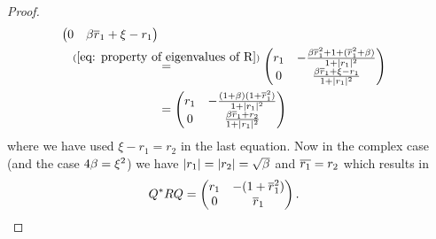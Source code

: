 \begin{proof}
\begin{align*}
\begin{pmatrix}
			0 &  \momCoeff\conjugate{r}_1 + \xi - r_1
		\end{pmatrix}\\
		&\lxeq{(\ref{eq: property of eigenvalues of R})}\begin{pmatrix}
			r_1
			& -\frac{\momCoeff \conjugate{r}_1^2 + 1+ (\conjugate{r}_1^2 + \momCoeff)}{1+|r_1|^2} \\
			0 &  \frac{\momCoeff\conjugate{r}_1 + \xi - r_1}{1+|r_1|^2}
		\end{pmatrix}\\
		&=\begin{pmatrix}
			r_1
			& -\frac{(1+\momCoeff)(1+\conjugate{r}_1^2)}{1+|r_1|^2} \\
			0 &  \frac{\momCoeff\conjugate{r}_1 + r_2}{1+|r_1|^2}
		\end{pmatrix}
	\end{align*}
	where we have used \(\xi - r_1 = r_2\) in the last equation. Now in the complex
	case (and the case \(4\beta = \xi^2\)) we have
	\(|r_1|=|r_2|=\sqrt{\beta}\) and \(\overline{r_1} = r_2\) which results
	in
	\begin{align*}
		Q^* R Q
		&=\begin{pmatrix}
			r_1
			& -(1+\overline{r}_1^2) \\
			0 & \overline{r}_1 
		\end{pmatrix}.
		\qedhere
	\end{align*}
\end{proof}

